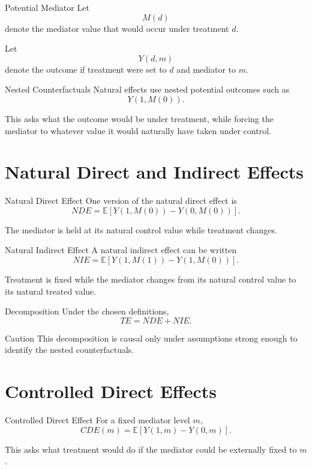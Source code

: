 \documentclass[aspectratio=169,11pt]{beamer}
\newcommand{\E}{\mathbb{E}}
\begin{document}
\begin{frame}{Potential Mediator}
Let
\[
M(d)
\]
denote the mediator value that would occur under treatment \(d\).

Let
\[
Y(d,m)
\]
denote the outcome if treatment were set to \(d\) and mediator to \(m\).
\end{frame}

\begin{frame}{Nested Counterfactuals}
Natural effects use nested potential outcomes such as
\[
Y(1,M(0)).
\]

This asks what the outcome would be under treatment, while forcing the mediator to whatever value it would naturally have taken under control.
\end{frame}

\section{Natural Direct and Indirect Effects}

\begin{frame}{Natural Direct Effect}
One version of the natural direct effect is
\[
NDE
=
\E[
Y(1,M(0))
-
Y(0,M(0))
].
\]

The mediator is held at its natural control value while treatment changes.
\end{frame}

\begin{frame}{Natural Indirect Effect}
A natural indirect effect can be written
\[
NIE
=
\E[
Y(1,M(1))
-
Y(1,M(0))
].
\]

Treatment is fixed while the mediator changes from its natural control value to its natural treated value.
\end{frame}

\begin{frame}{Decomposition}
Under the chosen definitions,
\[
TE=NDE+NIE.
\]

\begin{alertblock}{Caution}
This decomposition is causal only under assumptions strong enough to identify the nested counterfactuals.
\end{alertblock}
\end{frame}

\section{Controlled Direct Effects}

\begin{frame}{Controlled Direct Effect}
For a fixed mediator level \(m\),
\[
CDE(m)
=
\E[Y(1,m)-Y(0,m)].
\]

This asks what treatment would do if the mediator could be externally fixed to \(m\).
\end{frame}
\end{document}
